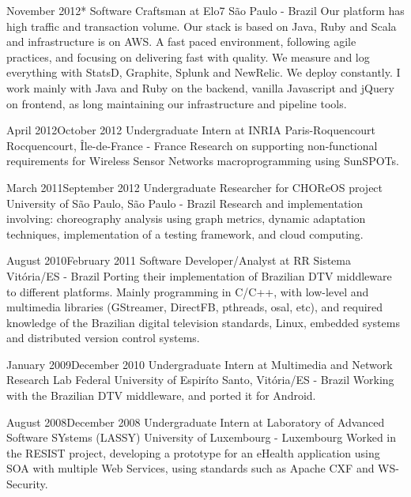 \documentclass{friggeri-cv}
\begin{document}
\workentry
  {November 2012}{*}
  {Software Craftsman at Elo7}
  {São Paulo - Brazil}
  {Our platform has high traffic and transaction volume. Our stack is based on Java, Ruby and Scala and infrastructure
  is on AWS. A fast paced environment, following agile practices, and focusing on delivering fast with quality. We
  measure and log everything with StatsD, Graphite, Splunk and NewRelic. We deploy constantly. I work mainly with Java
  and Ruby on the backend, vanilla Javascript and jQuery on frontend, as long maintaining our infrastructure and
  pipeline  tools.}

\workentry
  {April 2012}{October 2012}
  {Undergraduate Intern at INRIA Paris-Roquencourt}
  {Rocquencourt, Île-de-France - France}
  {Research on supporting non-functional requirements for Wireless Sensor Networks macroprogramming using SunSPOTs.}

\workentry
  {March 2011}{September 2012}
  {Undergraduate Researcher for CHOReOS project}
  {University of São Paulo, São Paulo - Brazil}
  {Research and implementation involving: choreography analysis using graph metrics,
  dynamic adaptation techniques, implementation of a testing framework, and cloud computing.}

\workentry
  {August 2010}{February 2011}
  {Software Developer/Analyst at RR Sistema}
  {Vitória/ES - Brazil}
  {Porting their implementation of Brazilian DTV middleware to different platforms.
  Mainly programming in C/C++, with low-level and multimedia libraries (GStreamer, DirectFB, pthreads, osal, etc),
  and required knowledge of the Brazilian digital television standards, Linux, embedded systems and
  distributed version control systems.}

\workentry
  {January 2009}{December 2010}
  {Undergraduate Intern at Multimedia and Network Research Lab}
  {Federal University of Espiríto Santo, Vitória/ES - Brazil}
  {Working with the Brazilian DTV middleware, and ported it for Android. }

\workentry
  {August 2008}{December 2008}
  {Undergraduate Intern at Laboratory of Advanced Software SYstems (LASSY)}
  {University of Luxembourg - Luxembourg}
  {Worked in the RESIST project, developing a prototype for an eHealth application using SOA with multiple Web Services,
  using standards such as Apache CXF and WS-Security.}

\end{document}
